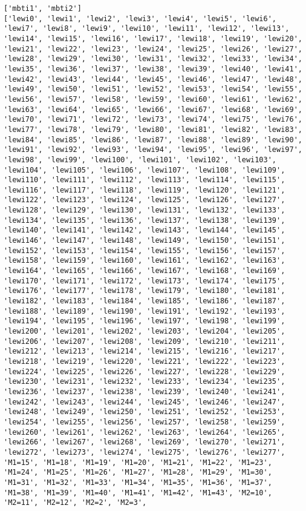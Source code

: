 \documentclass[12pt,fleqn]{article}\usepackage{../common}
\begin{document}
\begin{verbatim}
['mbti1', 'mbti2']
['lewi0', 'lewi1', 'lewi2', 'lewi3', 'lewi4', 'lewi5', 'lewi6', 'lewi7', 'lewi8', 'lewi9', 'lewi10', 'lewi11', 'lewi12', 'lewi13', 'lewi14', 'lewi15', 'lewi16', 'lewi17', 'lewi18', 'lewi19', 'lewi20', 'lewi21', 'lewi22', 'lewi23', 'lewi24', 'lewi25', 'lewi26', 'lewi27', 'lewi28', 'lewi29', 'lewi30', 'lewi31', 'lewi32', 'lewi33', 'lewi34', 'lewi35', 'lewi36', 'lewi37', 'lewi38', 'lewi39', 'lewi40', 'lewi41', 'lewi42', 'lewi43', 'lewi44', 'lewi45', 'lewi46', 'lewi47', 'lewi48', 'lewi49', 'lewi50', 'lewi51', 'lewi52', 'lewi53', 'lewi54', 'lewi55', 'lewi56', 'lewi57', 'lewi58', 'lewi59', 'lewi60', 'lewi61', 'lewi62', 'lewi63', 'lewi64', 'lewi65', 'lewi66', 'lewi67', 'lewi68', 'lewi69', 'lewi70', 'lewi71', 'lewi72', 'lewi73', 'lewi74', 'lewi75', 'lewi76', 'lewi77', 'lewi78', 'lewi79', 'lewi80', 'lewi81', 'lewi82', 'lewi83', 'lewi84', 'lewi85', 'lewi86', 'lewi87', 'lewi88', 'lewi89', 'lewi90', 'lewi91', 'lewi92', 'lewi93', 'lewi94', 'lewi95', 'lewi96', 'lewi97', 'lewi98', 'lewi99', 'lewi100', 'lewi101', 'lewi102', 'lewi103', 'lewi104', 'lewi105', 'lewi106', 'lewi107', 'lewi108', 'lewi109', 'lewi110', 'lewi111', 'lewi112', 'lewi113', 'lewi114', 'lewi115', 'lewi116', 'lewi117', 'lewi118', 'lewi119', 'lewi120', 'lewi121', 'lewi122', 'lewi123', 'lewi124', 'lewi125', 'lewi126', 'lewi127', 'lewi128', 'lewi129', 'lewi130', 'lewi131', 'lewi132', 'lewi133', 'lewi134', 'lewi135', 'lewi136', 'lewi137', 'lewi138', 'lewi139', 'lewi140', 'lewi141', 'lewi142', 'lewi143', 'lewi144', 'lewi145', 'lewi146', 'lewi147', 'lewi148', 'lewi149', 'lewi150', 'lewi151', 'lewi152', 'lewi153', 'lewi154', 'lewi155', 'lewi156', 'lewi157', 'lewi158', 'lewi159', 'lewi160', 'lewi161', 'lewi162', 'lewi163', 'lewi164', 'lewi165', 'lewi166', 'lewi167', 'lewi168', 'lewi169', 'lewi170', 'lewi171', 'lewi172', 'lewi173', 'lewi174', 'lewi175', 'lewi176', 'lewi177', 'lewi178', 'lewi179', 'lewi180', 'lewi181', 'lewi182', 'lewi183', 'lewi184', 'lewi185', 'lewi186', 'lewi187', 'lewi188', 'lewi189', 'lewi190', 'lewi191', 'lewi192', 'lewi193', 'lewi194', 'lewi195', 'lewi196', 'lewi197', 'lewi198', 'lewi199', 'lewi200', 'lewi201', 'lewi202', 'lewi203', 'lewi204', 'lewi205', 'lewi206', 'lewi207', 'lewi208', 'lewi209', 'lewi210', 'lewi211', 'lewi212', 'lewi213', 'lewi214', 'lewi215', 'lewi216', 'lewi217', 'lewi218', 'lewi219', 'lewi220', 'lewi221', 'lewi222', 'lewi223', 'lewi224', 'lewi225', 'lewi226', 'lewi227', 'lewi228', 'lewi229', 'lewi230', 'lewi231', 'lewi232', 'lewi233', 'lewi234', 'lewi235', 'lewi236', 'lewi237', 'lewi238', 'lewi239', 'lewi240', 'lewi241', 'lewi242', 'lewi243', 'lewi244', 'lewi245', 'lewi246', 'lewi247', 'lewi248', 'lewi249', 'lewi250', 'lewi251', 'lewi252', 'lewi253', 'lewi254', 'lewi255', 'lewi256', 'lewi257', 'lewi258', 'lewi259', 'lewi260', 'lewi261', 'lewi262', 'lewi263', 'lewi264', 'lewi265', 'lewi266', 'lewi267', 'lewi268', 'lewi269', 'lewi270', 'lewi271', 'lewi272', 'lewi273', 'lewi274', 'lewi275', 'lewi276', 'lewi277', 'M1=15', 'M1=18', 'M1=19', 'M1=20', 'M1=21', 'M1=22', 'M1=23', 'M1=24', 'M1=25', 'M1=26', 'M1=27', 'M1=28', 'M1=29', 'M1=30', 'M1=31', 'M1=32', 'M1=33', 'M1=34', 'M1=35', 'M1=36', 'M1=37', 'M1=38', 'M1=39', 'M1=40', 'M1=41', 'M1=42', 'M1=43', 'M2=10', 'M2=11', 'M2=12', 'M2=2', 'M2=3', 
\end{verbatim}
\end{document}
